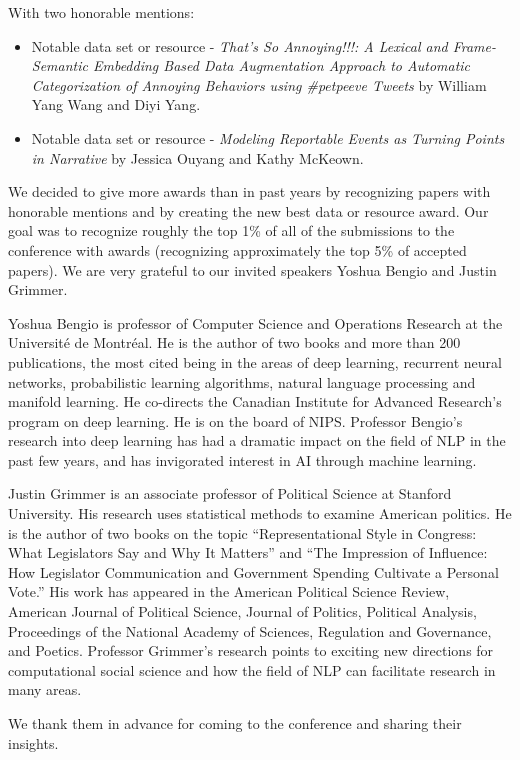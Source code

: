 With two honorable mentions: 
\begin{itemize}[itemsep=0pt]
\item Notable data set or resource - \textit{That's So Annoying!!!: A Lexical
and Frame-Semantic Embedding Based Data Augmentation Approach to Automatic
Categorization of Annoying Behaviors using \#petpeeve Tweets} by William
Yang Wang and Diyi Yang. 
\item Notable data set or resource - \textit{Modeling Reportable Events
as Turning Points in Narrative} by Jessica Ouyang and Kathy McKeown.
\end{itemize}
We decided to give more awards than in past years by recognizing papers
with honorable mentions and by creating the new best data or resource
award. Our goal was to recognize roughly the top 1\% of all of the
submissions to the conference with awards (recognizing approximately
the top 5\% of accepted papers). We are very grateful to our invited
speakers Yoshua Bengio and Justin Grimmer.

Yoshua Bengio is professor of Computer Science and Operations Research
at the Université de Montréal. He is the author of two books and more
than 200 publications, the most cited being in the areas of deep learning,
recurrent neural networks, probabilistic learning algorithms, natural
language processing and manifold learning. He co-directs the Canadian
Institute for Advanced Research's program on deep learning. He is
on the board of NIPS. Professor Bengio's research into deep learning
has had a dramatic impact on the field of NLP in the past few years,
and has invigorated interest in AI through machine learning.

Justin Grimmer is an associate professor of Political Science at Stanford
University. His research uses statistical methods to examine American
politics. He is the author of two books on the topic ``Representational
Style in Congress: What Legislators Say and Why It Matters'' and
``The Impression of Influence: How Legislator Communication and Government
Spending Cultivate a Personal Vote.'' His work has appeared in the
American Political Science Review, American Journal of Political Science,
Journal of Politics, Political Analysis, Proceedings of the National
Academy of Sciences, Regulation and Governance, and Poetics. Professor
Grimmer's research points to exciting new directions for computational
social science and how the field of NLP can facilitate research in
many areas.

We thank them in advance for coming to the conference and sharing
their insights.

